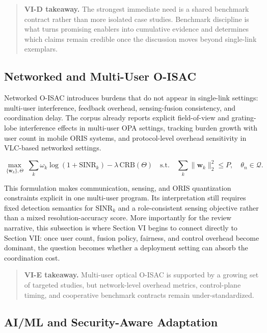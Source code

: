 \begin{quote}
\textbf{VI-D takeaway.} The strongest immediate need is a shared benchmark contract rather than more isolated case studies. Benchmark discipline is what turns promising enablers into cumulative evidence and determines which claims remain credible once the discussion moves beyond single-link exemplars.
\end{quote}

\subsection{Networked and Multi-User O-ISAC}
\label{sec:enablers-networked}

Networked O-ISAC introduces burdens that do not appear in single-link settings: multi-user interference, feedback overhead, sensing-fusion consistency, and coordination delay. The corpus already reports explicit field-of-view and grating-lobe interference effects in multi-user OPA settings, tracking burden growth with user count in mobile ORIS systems, and protocol-level overhead sensitivity in VLC-based networked settings.

\begin{equation}
\label{eq:enablers-networked}
\max_{\{\mathbf{w}_k\},\Theta}\;\sum_{k}\omega_k\log\!\left(1+\mathrm{SINR}_k\right)-\lambda\,\mathrm{CRB}(\Theta)
\quad
\text{s.t.}\quad \sum_k\|\mathbf{w}_k\|_2^2\le P,\quad \theta_n\in\mathcal Q.
\end{equation}

This formulation makes communication, sensing, and ORIS quantization constraints explicit in one multi-user program. Its interpretation still requires fixed detection semantics for $\mathrm{SINR}_k$ and a role-consistent sensing objective rather than a mixed resolution-accuracy score. More importantly for the review narrative, this subsection is where Section VI begins to connect directly to Section VII: once user count, fusion policy, fairness, and control overhead become dominant, the question becomes whether a deployment setting can absorb the coordination cost.

\begin{quote}
\textbf{VI-E takeaway.} Multi-user optical O-ISAC is supported by a growing set of targeted studies, but network-level overhead metrics, control-plane timing, and cooperative benchmark contracts remain under-standardized.
\end{quote}

\subsection{AI/ML and Security-Aware Adaptation}
\label{sec:enablers-ai-security}

